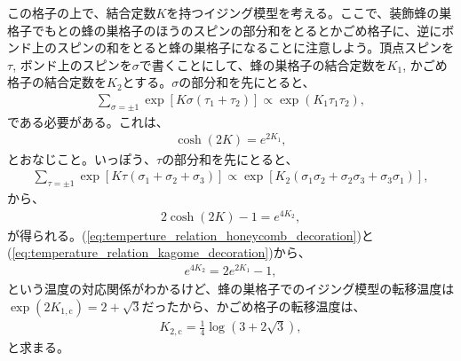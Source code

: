 \documentclass[paper=b5j,fontsize=12Q,jafontsize=12Q,baselineskip=21Q]{jlreq}
\begin{document}
\begin{refsection}

この格子の上で、結合定数$K$を持つイジング模型を考える。ここで、装飾蜂の巣格子でもとの蜂の巣格子のほうのスピンの部分和をとるとかごめ格子に、逆にボンド上のスピンの和をとると蜂の巣格子になることに注意しよう。頂点スピンを$\tau$, ボンド上のスピンを$\sigma$で書くことにして、蜂の巣格子の結合定数を$K_1$, かごめ格子の結合定数を$K_2$とする。$\sigma$の部分和を先にとると、
\begin{align}
  \sum_{\sigma=\pm1}\exp\left[K\sigma(\tau_1+\tau_2)\right]\propto\exp(K_1\tau_1\tau_2),
\end{align}
である必要がある。これは、
\begin{align}
  \cosh(2K)=e^{2K_1},\label{eq:temperture_relation_honeycomb_decoration}
\end{align}
とおなじこと。いっぽう、$\tau$の部分和を先にとると、
\begin{align}
  \sum_{\tau=\pm1}\exp\left[K\tau(\sigma_1+\sigma_2+\sigma_3)\right]\propto\exp\left[K_2(\sigma_1\sigma_2+\sigma_2\sigma_3+\sigma_3\sigma_1)\right],
\end{align}
から、
\begin{align}
  2\cosh(2K)-1=e^{4K_2},\label{eq:temperature_relation_kagome_decoration}
\end{align}
が得られる。(\ref{eq:temperture_relation_honeycomb_decoration})と(\ref{eq:temperature_relation_kagome_decoration})から、
\begin{align}
  e^{4K_2}=2e^{2K_1}-1,
\end{align}
という温度の対応関係がわかるけど、蜂の巣格子でのイジング模型の転移温度は$\exp(2K_{1,\mathrm c})=2+\sqrt3$だったから、かごめ格子の転移温度は、
\begin{align}
  K_{2,\mathrm c}=\frac14\log(3+2\sqrt3),
\end{align}
と求まる。


\end{refsection}
\end{document}
